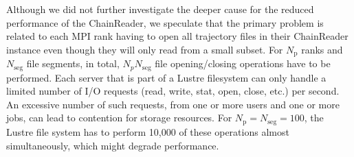 Although we did not further investigate the deeper cause for the reduced performance of the ChainReader, we speculate that the primary problem is related to each MPI rank having to open all trajectory files in their ChainReader instance even though they will only read from a small subset.
For $N_{\text{p}}$ ranks and $N_{\text{seg}}$ file segments, in total, $N_{p } N_{\text{seg}}$ file opening/closing operations have to be performed. 
Each server that is part of a Lustre filesystem can only handle a limited number of I/O requests (read, write, stat, open, close, etc.) per second.
An excessive number of such requests, from one or more users and one or more jobs, can lead to contention for storage resources. 
For $N_{\text{p}} = N_{\text{seg}} = 100$, the Lustre file system has to perform 10,000 of these operations almost simultaneously, which might degrade performance. 


